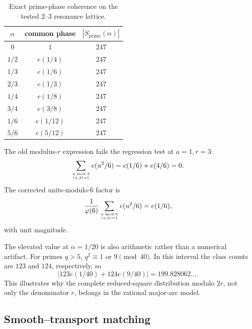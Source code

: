 \documentclass[11pt]{article}
\theoremstyle{definition}
\newcommand{\1}{\mathbf{1}}
\begin{document}
\begin{table}[htbp]
\centering
\caption{Exact prime-phase coherence on the tested $2$--$3$ resonance lattice.}
\label{tab:toy-prime-resonance}
\small
\begin{tabular}{ccc}
\toprule
$\alpha$ & common phase & $|S_{\mathrm{prime}}(\alpha)|$\\
\midrule
$0$ & $1$ & $247$\\
$1/2$ & $e(1/4)$ & $247$\\
$1/3$ & $e(1/6)$ & $247$\\
$2/3$ & $e(1/3)$ & $247$\\
$1/4$ & $e(1/8)$ & $247$\\
$3/4$ & $e(3/8)$ & $247$\\
$1/6$ & $e(1/12)$ & $247$\\
$5/6$ & $e(5/12)$ & $247$\\
\bottomrule
\end{tabular}
\end{table}

The old modulus-$r$ expression fails the regression test at $a=1,r=3$:
\begin{equation}
 \sum_{u\bmod3\atop(u,3)=1}e(u^2/6)=e(1/6)+e(4/6)=0.
 \label{eq:old-r3-regression-failure}
\end{equation}
The corrected units-modulo-$6$ factor is
\begin{equation}
 \frac1{\varphi(6)}
 \sum_{u\bmod6\atop(u,6)=1}e(u^2/6)
 =e(1/6),
 \label{eq:correct-r3-regression}
\end{equation}
with unit magnitude.

The elevated value at $\alpha=1/20$ is also arithmetic rather than a numerical artifact.  For primes $q>5$, $q^2\equiv1$ or $9\pmod{40}$.  In this interval the class counts are $123$ and $124$, respectively, so
\begin{equation}
 \left|123e(1/40)+124e(9/40)\right|
 =199.828062\ldots.
 \label{eq:one-twentieth-secondary-resonance}
\end{equation}
This illustrates why the complete reduced-square distribution modulo $2r$, not only the denominator $r$, belongs in the rational major-arc model.

\subsection{Smooth--transport matching}
\end{document}

